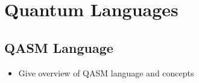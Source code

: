 \section{Quantum Languages}

\subsection{QASM Language}
\begin{itemize}
    \item Give overview of QASM language and concepts
\end{itemize}